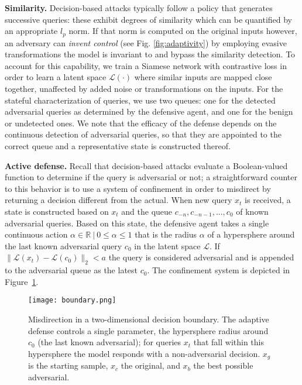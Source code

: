 \textbf{Similarity.} Decision-based attacks typically follow a policy that generates successive queries: these exhibit degrees of similarity which can be quantified by an appropriate $l_p$ norm.
If that norm is computed on the original inputs however, an adversary can \textit{invent control} (see Fig. \ref{fig:adaptivity}) by employing evasive transformations the model is invariant to and bypass the similarity detection.
To account for this capability, we train a Siamese network with contrastive loss in order to learn a latent space $\mathcal{L}(\cdot)$ where similar inputs are mapped close together, unaffected by added noise or transformations on the inputs.
For the stateful characterization of queries, we use two queues: one for the detected adversarial queries as determined by the defensive agent, and one for the benign or undetected ones.
We note that the efficacy of the defense depends on the continuous detection of adversarial queries, so that they are appointed to the correct queue and a representative state is constructed thereof.

\textbf{Active defense.} Recall that decision-based attacks evaluate a Boolean-valued function to determine if the query is adversarial or not; a straightforward counter to this behavior is to use a system of confinement in order to misdirect by returning a decision different from the actual.
When new query $x_t$ is received, a state is constructed based on $x_t$ and the queue $c_{-n}, c_{-n-1}, ..., c_{0}$ of known adversarial queries.
Based on this state, the defensive agent takes a single continuous action $\alpha \in \mathbb{R} \:|\: 0\leq \alpha \leq1$ that is the radius $\alpha$ of a hypersphere around the last known adversarial query $c_0$ in the latent space $\mathcal{L}$.
If $\|\mathcal{L}(x_t) - \mathcal{L}(c_0)\|_2 < a$ the query is considered adversarial and is appended to the adversarial queue as the latest $c_0$.
The confinement system is depicted in Figure~\ref{fig:boundary}.

\begin{figure}
    \centering
    \texttt{[image: boundary.png]}
    \caption{Misdirection in a two-dimensional decision boundary. The adaptive defense controls a single parameter, the hypersphere radius around $c_0$ (the last known adversarial); for queries $x_t$ that fall within this hypersphere the model responds with a non-adversarial decision. $x_g$ is the starting sample, $x_c$ the original, and $x_b$ the best possible adversarial.}
    \label{fig:boundary}
\end{figure}

